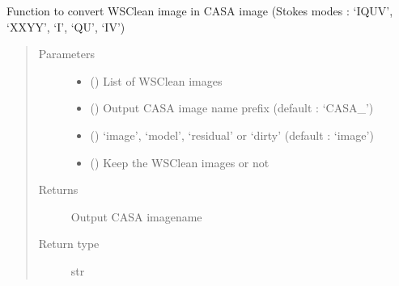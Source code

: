 \documentclass[letterpaper,10pt,english]{sphinxmanual}
\begin{document}
\begin{fulllineitems}
\begin{fulllineitems}
\begin{quote}
\begin{description}
\end{description}\end{quote}

\end{fulllineitems}


\begin{fulllineitems}
\label{\detokenize{paircars:paircars.fullpol_selfcal_LTS.PolSelfcal.wsclean_to_casaimage}}
\sphinxAtStartPar
Function to convert WSClean image in CASA image (Stokes modes : ‘IQUV’, ‘XXYY’, ‘I’, ‘QU’, ‘IV’)
\begin{quote}\begin{description}
\item[{Parameters}] \leavevmode\begin{itemize}
\item {} 
\sphinxAtStartPar
{} () \textendash{} List of WSClean images

\item {} 
\sphinxAtStartPar
{} () \textendash{} Output CASA image name prefix (default : ‘CASA\_’)

\item {} 
\sphinxAtStartPar
{} () \textendash{} ‘image’, ‘model’, ‘residual’ or ‘dirty’ (default : ‘image’)

\item {} 
\sphinxAtStartPar
{} () \textendash{} Keep the WSClean images or not

\end{itemize}

\item[{Returns}] \leavevmode
\sphinxAtStartPar
Output CASA imagename

\item[{Return type}] \leavevmode
\sphinxAtStartPar
str

\end{description}\end{quote}

\end{fulllineitems}


\end{fulllineitems}
\end{document}
